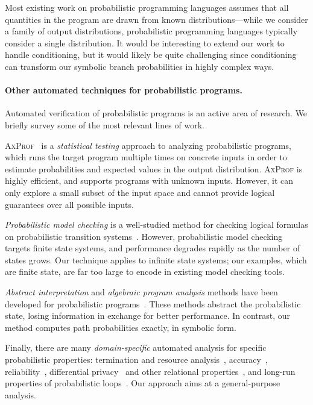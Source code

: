 Most existing work on probabilistic programming languages assumes that all
quantities in the program are drawn from known distributions---while we consider
a family of output distributions, probabilistic programming languages typically
consider a single distribution. It would be interesting to extend our work to
handle conditioning, but it would likely be quite challenging since conditioning
can transform our symbolic branch probabilities in highly complex ways.

\paragraph*{Other automated techniques for probabilistic programs.}
Automated verification of probabilistic programs is an active area of research.
We briefly survey some of the most relevant lines of work.

\textsc{AxProf}~\citep{axprof_2019} is a \emph{statistical testing} approach to
analyzing probabilistic programs, which runs the target program multiple times
on concrete inputs in order to estimate probabilities and expected values in the
output distribution. \textsc{AxProf} is highly efficient, and supports programs
with unknown inputs. However, it can only explore a small subset of the input
space and cannot provide logical guarantees over all possible inputs.

\emph{Probabilistic model checking} is a well-studied method for checking
logical formulas on probabilistic transition
systems~\citep{DBLP:conf/icalp/BaierCHKR97, DBLP:reference/mc/BaierAFK18,
kwiatkowska2011prism, dehnert_2017}. However, probabilistic model checking
targets finite state systems, and performance degrades rapidly as the number of
states grows. Our technique applies to infinite state systems; our examples,
which are finite state, are far too large to encode in existing model checking
tools.

\emph{Abstract interpretation} and \emph{algebraic program analysis} methods
have been developed for probabilistic programs~\citep{CousotM12,
DBLP:conf/pldi/WangHR18}. These methods abstract the probabilistic state, losing
information in exchange for better performance.  In contrast, our method
computes path probabilities exactly, in symbolic form.

Finally, there are many \emph{domain-specific} automated analysis for specific
probabilistic properties: termination and resource
analysis~\citep{Chatterjee:2016:AAQ:2837614.2837639, wang_2021,
DBLP:conf/esop/MoosbruggerBKK21}, accuracy~\citep{Chakarov-martingale, SHA18},
reliability~\citep{DBLP:conf/pldi/CarbinKMR12}, differential
privacy~\citep{DBLP:journals/pacmpl/BartheCKS021} and other relational
properties~\citep{AH17, AH18, DBLP:conf/esop/FarinaCG21}, and long-run
properties of probabilistic loops~\citep{DBLP:conf/atva/BartocciKS19,
DBLP:conf/tacas/BartocciKS20}. Our approach aims at a general-purpose analysis.
